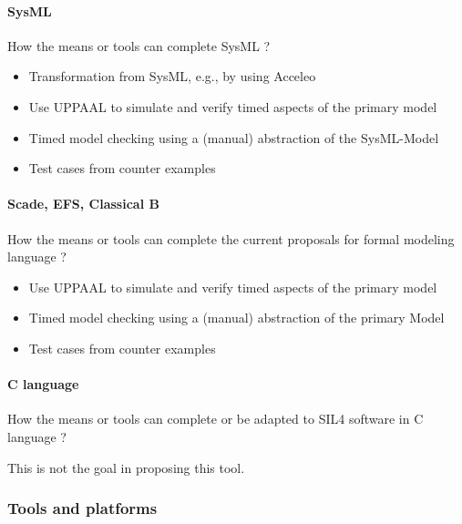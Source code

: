 \paragraph{SysML}
How the means or tools can complete SysML ?

\begin{author_comment}
\begin{itemize}
  \item Transformation from SysML, e.g., by using Acceleo
  \item Use UPPAAL to simulate and verify timed aspects of the primary model
  \item Timed model checking using a (manual) abstraction of the SysML-Model
  \item Test cases from counter examples
\end{itemize}
\end{author_comment}

\paragraph{Scade, EFS, Classical B}
How the means or tools can complete the current proposals for formal modeling language ?

\begin{author_comment}
\begin{itemize}
  \item Use UPPAAL to simulate and verify timed aspects of the primary model
  \item Timed model checking using a (manual) abstraction of the primary Model
  \item Test cases from counter examples
\end{itemize}
\end{author_comment}

\paragraph{C language}
How the means or tools can complete or be adapted to SIL4 software in C language ?

\begin{author_comment}
This is not the goal in proposing this tool.
\end{author_comment}

\subsubsection{Tools and platforms}

